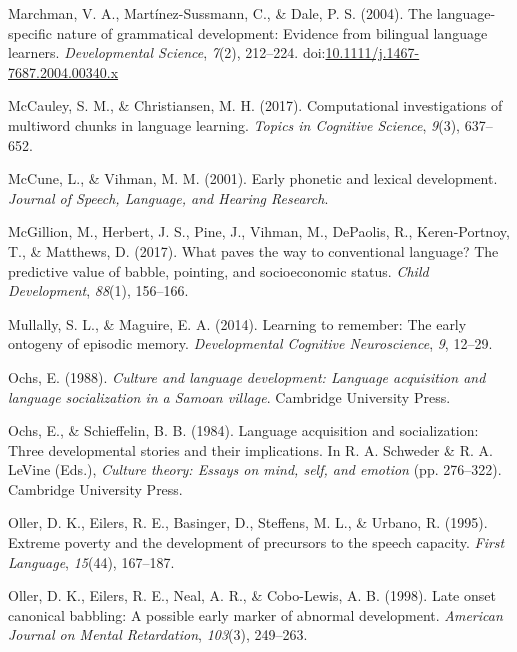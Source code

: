 \documentclass[,man,floatsintext]{apa6}
\begin{document}
\hypertarget{ref-marchman2004language}{}
Marchman, V. A., Martínez-Sussmann, C., \& Dale, P. S. (2004). The
language-specific nature of grammatical development: Evidence from
bilingual language learners. \emph{Developmental Science}, \emph{7}(2),
212--224.
doi:\href{https://doi.org/10.1111/j.1467-7687.2004.00340.x}{10.1111/j.1467-7687.2004.00340.x}

\hypertarget{ref-mccauley2017computational}{}
McCauley, S. M., \& Christiansen, M. H. (2017). Computational
investigations of multiword chunks in language learning. \emph{Topics in
Cognitive Science}, \emph{9}(3), 637--652.

\hypertarget{ref-mccune2001early}{}
McCune, L., \& Vihman, M. M. (2001). Early phonetic and lexical
development. \emph{Journal of Speech, Language, and Hearing Research}.

\hypertarget{ref-mcgillion2017paves}{}
McGillion, M., Herbert, J. S., Pine, J., Vihman, M., DePaolis, R.,
Keren-Portnoy, T., \& Matthews, D. (2017). What paves the way to
conventional language? The predictive value of babble, pointing, and
socioeconomic status. \emph{Child Development}, \emph{88}(1), 156--166.

\hypertarget{ref-mullally2014learning}{}
Mullally, S. L., \& Maguire, E. A. (2014). Learning to remember: The
early ontogeny of episodic memory. \emph{Developmental Cognitive
Neuroscience}, \emph{9}, 12--29.

\hypertarget{ref-ochs1988culture}{}
Ochs, E. (1988). \emph{Culture and language development: Language
acquisition and language socialization in a Samoan village}. Cambridge
University Press.

\hypertarget{ref-ochs1984language}{}
Ochs, E., \& Schieffelin, B. B. (1984). Language acquisition and
socialization: Three developmental stories and their implications. In R.
A. Schweder \& R. A. LeVine (Eds.), \emph{Culture theory: Essays on
mind, self, and emotion} (pp. 276--322). Cambridge University Press.

\hypertarget{ref-oller1995extreme}{}
Oller, D. K., Eilers, R. E., Basinger, D., Steffens, M. L., \& Urbano,
R. (1995). Extreme poverty and the development of precursors to the
speech capacity. \emph{First Language}, \emph{15}(44), 167--187.

\hypertarget{ref-oller1998late}{}
Oller, D. K., Eilers, R. E., Neal, A. R., \& Cobo-Lewis, A. B. (1998).
Late onset canonical babbling: A possible early marker of abnormal
development. \emph{American Journal on Mental Retardation},
\emph{103}(3), 249--263.
\end{document}
